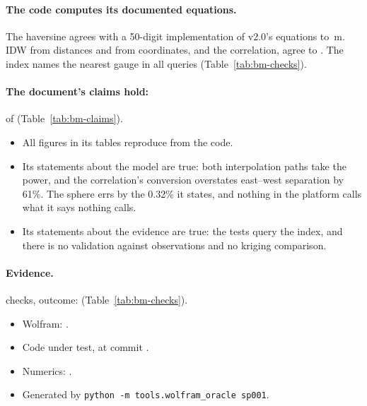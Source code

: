 \documentclass[11pt,a4paper]{article}
\begin{document}
\paragraph{The code computes its documented equations.} The haversine agrees with a
50-digit implementation of v2.0's equations to \bmHavErr\,m. IDW from distances and from
coordinates, and the correlation, agree to \bmCodeErr. The index names the nearest gauge in
all \bmTreeQueries{} queries (Table~\ref{tab:bm-checks}). \bmWolframConfirms{}

\paragraph{The document's claims hold:} \bmClaimsMet{} of \bmClaims{}
(Table~\ref{tab:bm-claims}).
\begin{itemize}[leftmargin=*,nosep]
\item All \bmFigures{} figures in its tables reproduce from the code.
\item Its statements about the model are true: both interpolation paths take the power, and
  the correlation's conversion overstates east--west separation by 61\%. The sphere errs by
  the 0.32\% it states, and nothing in the platform calls what it says nothing calls.
\item Its statements about the evidence are true: the tests query the index, and there is
  no validation against observations and no kriging comparison.
\end{itemize}

\paragraph{Evidence.} \bmChecks{} checks, outcome: \bmOutcome{}
(Table~\ref{tab:bm-checks}).
\begin{itemize}[leftmargin=*,nosep]
\item Wolfram: \bmWolfram{}\bmWolframVia.
\item Code under test, at commit \bmCodeCommit{}\bmCodeDirty.
\item Numerics: \bmNumerics.
\item Generated \bmGenerated{} by \texttt{python -m tools.wolfram\_oracle sp001}.
\end{itemize}

\mkmpurpose
\end{document}
